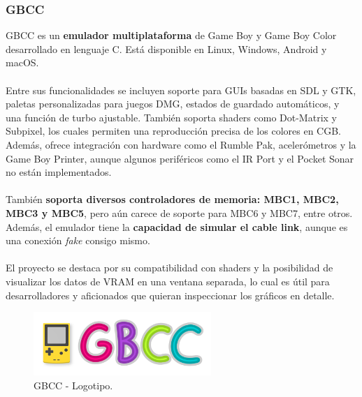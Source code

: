 \subsubsection{GBCC}
GBCC es un \textbf{emulador multiplataforma} de Game Boy y Game Boy Color desarrollado en lenguaje C. Está disponible en Linux, Windows, Android y macOS.
\\\\
Entre sus funcionalidades se incluyen soporte para GUIs basadas en SDL y GTK, paletas personalizadas para juegos DMG, estados de guardado automáticos, y una función de turbo ajustable. También soporta shaders como Dot-Matrix y Subpixel, los cuales permiten una reproducción precisa de los colores en CGB. Además, ofrece integración con hardware como el Rumble Pak, acelerómetros y la Game Boy Printer, aunque algunos periféricos como el IR Port y el Pocket Sonar no están implementados.
\\\\
También \textbf{soporta diversos controladores de memoria: MBC1, MBC2, MBC3 y MBC5}, pero aún carece de soporte para MBC6 y MBC7, entre otros. Además, el emulador tiene la \textbf{capacidad de simular el cable link}, aunque es una conexión \textit{fake} consigo mismo.
\\\\
El proyecto se destaca por su compatibilidad con shaders y la posibilidad de visualizar los datos de VRAM en una ventana separada, lo cual es útil para desarrolladores y aficionados que quieran inspeccionar los gráficos en detalle.

\begin{figure}[h]
    \centering
    \includegraphics[width=0.6\textwidth]{include/images/gbcclogo.png}
    \caption{GBCC - Logotipo.}
    \label{figure:gbcclogo}
\end{figure}

